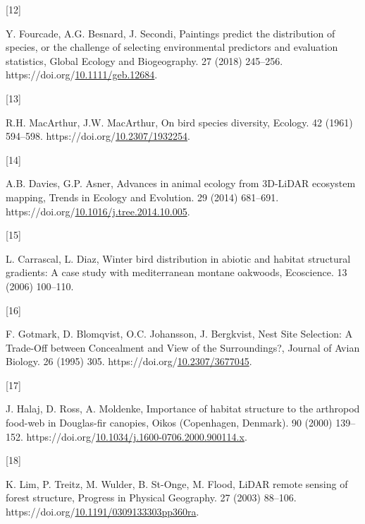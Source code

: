 \documentclass[manuscript, 3p, authoryear]{elsarticle} %
\newlength{\cslhangindent}
\newlength{\csllabelwidth}
\newlength{\cslentryspacingunit} %
\newenvironment{CSLReferences}[2] %
 {%
  \setlength{\parindent}{0pt}
  \ifodd #1
  \let\oldpar\par
  \def\par{\hangindent=\cslhangindent\oldpar}
  \fi
  \setlength{\parskip}{#2\cslentryspacingunit}
 }%
 {}
\newcommand{\CSLLeftMargin}[1]{\parbox[t]{\csllabelwidth}{#1}}
\newcommand{\CSLRightInline}[1]{\parbox[t]{\linewidth - \csllabelwidth}{#1}\break}
\begin{document}
\begin{CSLReferences}{0}{0}
\leavevmode{}%
\CSLLeftMargin{{[}12{]} }%
\CSLRightInline{Y. Fourcade, A.G. Besnard, J. Secondi, Paintings predict the distribution of species, or the challenge of selecting environmental predictors and evaluation statistics, Global Ecology and Biogeography. 27 (2018) 245--256. https://doi.org/\href{https://doi.org/10.1111/geb.12684}{10.1111/geb.12684}.}

\leavevmode{}%
\CSLLeftMargin{{[}13{]} }%
\CSLRightInline{R.H. MacArthur, J.W. MacArthur, On bird species diversity, Ecology. 42 (1961) 594--598. https://doi.org/\href{https://doi.org/10.2307/1932254}{10.2307/1932254}.}

\leavevmode{}%
\CSLLeftMargin{{[}14{]} }%
\CSLRightInline{A.B. Davies, G.P. Asner, Advances in animal ecology from {3D-LiDAR} ecosystem mapping, Trends in Ecology and Evolution. 29 (2014) 681--691. https://doi.org/\href{https://doi.org/10.1016/j.tree.2014.10.005}{10.1016/j.tree.2014.10.005}.}

\leavevmode{}%
\CSLLeftMargin{{[}15{]} }%
\CSLRightInline{L. Carrascal, L. Diaz, Winter bird distribution in abiotic and habitat structural gradients: A case study with mediterranean montane oakwoods, Ecoscience. 13 (2006) 100--110.}

\leavevmode{}%
\CSLLeftMargin{{[}16{]} }%
\CSLRightInline{F. Gotmark, D. Blomqvist, O.C. Johansson, J. Bergkvist, Nest {Site Selection}: {A Trade-Off} between {Concealment} and {View} of the {Surroundings}?, Journal of Avian Biology. 26 (1995) 305. https://doi.org/\href{https://doi.org/10.2307/3677045}{10.2307/3677045}.}

\leavevmode{}%
\CSLLeftMargin{{[}17{]} }%
\CSLRightInline{J. Halaj, D. Ross, A. Moldenke, Importance of habitat structure to the arthropod food-web in {Douglas-fir} canopies, Oikos (Copenhagen, Denmark). 90 (2000) 139--152. https://doi.org/\href{https://doi.org/10.1034/j.1600-0706.2000.900114.x}{10.1034/j.1600-0706.2000.900114.x}.}

\leavevmode{}%
\CSLLeftMargin{{[}18{]} }%
\CSLRightInline{K. Lim, P. Treitz, M. Wulder, B. St-Onge, M. Flood, {LiDAR} remote sensing of forest structure, Progress in Physical Geography. 27 (2003) 88--106. https://doi.org/\href{https://doi.org/10.1191/0309133303pp360ra}{10.1191/0309133303pp360ra}.}


\end{CSLReferences}
\end{document}
